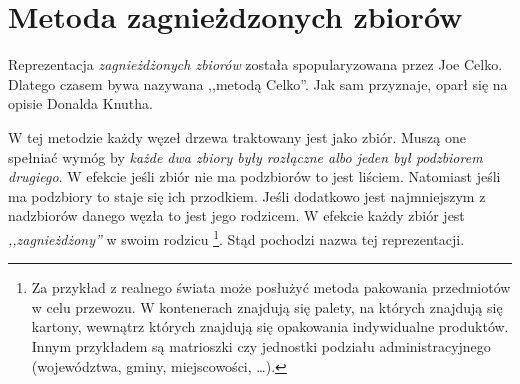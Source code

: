 \section{Metoda zagnieżdzonych zbiorów}

Reprezentacja \emph{zagnieżdżonych zbiorów}  została spopularyzowana przez Joe Celko\cite{celko-sql}.
Dlatego czasem bywa nazywana ,,metodą Celko''.
Jak sam przyznaje, oparł się na opisie Donalda Knutha\cite{knuth}.





%


W tej metodzie każdy węzeł drzewa traktowany jest jako zbiór.
Muszą one spełniać wymóg by \emph{każde dwa zbiory były rozłączne albo jeden był podzbiorem drugiego}.
W efekcie jeśli zbiór nie ma podzbiorów to jest liściem.
Natomiast jeśli ma podzbiory to staje się ich przodkiem.
Jeśli dodatkowo jest najmniejszym z nadzbiorów danego węzła to jest jego rodzicem.
W efekcie każdy zbiór jest \emph{,,zagnieżdżony''} w swoim rodzicu%
\footnote{
    Za przykład z realnego świata może posłużyć metoda pakowania przedmiotów w celu przewozu.
    W kontenerach znajdują się palety, na których znajdują się kartony, wewnątrz których znajdują się opakowania indywidualne produktów.
    Innym przykładem są matrioszki czy jednostki podziału administracyjnego (województwa, gminy, miejscowości, \ldots).
}.
Stąd pochodzi nazwa tej reprezentacji.

